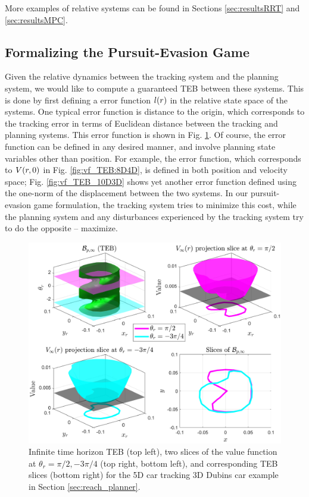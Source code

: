 More examples of relative systems can be found in Sections \ref{sec:resultsRRT} and \ref{sec:resultsMPC}.

\subsection{Formalizing the Pursuit-Evasion Game}
Given the relative dynamics between the tracking system and the planning system, we would like to compute a guaranteed TEB between these systems. 
This is done by first defining a error function $l(r)$ in the relative state space of the systems. 
One typical error function is distance to the origin, which corresponds to the tracking error in terms of Euclidean distance between the tracking and planning systems. 
This error function is shown in Fig. \ref{fig:vf_TEB:5D3D}. 
Of course, the error function can be defined in any desired manner, and involve planning state variables other than position.
For example, the error function, which corresponds to $V(r, 0)$ in Fig. \ref{fig:vf_TEB:8D4D}, is defined in both position and velocity space; Fig. \ref{fig:vf_TEB_10D3D} shows yet another error function defined using the one-norm of the displacement between the two systems. 
In our pursuit-evasion game formulation, the tracking system tries to minimize this cost, while the planning system and any disturbances experienced by the tracking system try to do the opposite -- maximize.

\begin{figure}
  \includegraphics[width=\columnwidth]{fig/ti_valfunc_5d3d}
  \caption{Infinite time horizon TEB (top left), two slices of the value function at $\theta_r = \pi/2, -3\pi/4$ (top right, bottom left), and corresponding TEB slices (bottom right) for the 5D car tracking 3D Dubins car example in Section \ref{sec:reach_planner}.}
  \label{fig:vf_TEB:5D3D}  
\end{figure}

